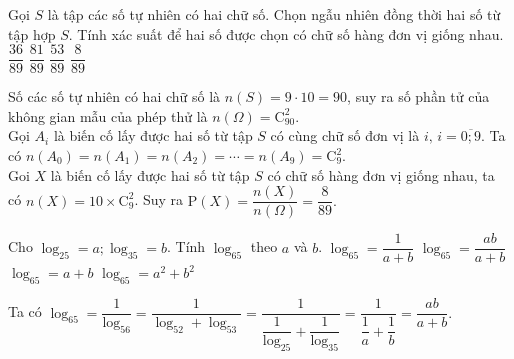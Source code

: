 \begin{ex}
{}	

\end{ex}

\begin{ex}%
	Gọi $S$ là tập các số tự nhiên có hai chữ số. Chọn ngẫu nhiên đồng thời hai số từ tập hợp $S$. Tính xác suất để hai số được chọn có chữ số hàng đơn vị giống nhau.
		\choice
	{$\dfrac{36}{89}$}
	{$\dfrac{81}{89}$}
	{$\dfrac{53}{89}$}
	{\True $\dfrac{8}{89}$}
	\loigiai
	{ Số các số tự nhiên có hai chữ số là $ n(S)=9 \cdot 10= 90$, suy ra số phần tử của không gian mẫu của phép thử là $n \left( \Omega\right) = \mathrm{C}_{90}^2$.\\
		Gọi $A_i$ là biến cố lấy được hai số từ tập $S$ có cùng chữ số đơn vị là $i, \, i= \overline{0;9}$. Ta có $n(A_0)= n(A_1) =n(A_2) = \cdots = n(A_9) =\mathrm{C}_{9}^2. $\\
		Goi $X$ là biến cố lấy được hai số từ tập $S$ có chữ số hàng đơn vị giống nhau, ta có $n (X) = 10 \times \mathrm{C}_{9}^2$. Suy ra $\mathrm{P}(X) = \dfrac{n(X)}{n(\Omega)} = \dfrac{8}{89}.$
		
	}
\end{ex}

\begin{ex}%
	Cho $\log_25=a; \log_35=b$. Tính $\log_65$ theo $a$ và $b$.
		\choice
	{$\log_65 = \dfrac{1}{a+b}$}
	{\True $\log_65 = \dfrac{ab}{a+b}$}
	{$\log_65=a+b$}
	{$\log_65 =a^2+b^2$}
	\loigiai
	{ Ta có $\log_65 =\dfrac{1}{\log_56}= \dfrac{1}{\log_52+\log_53}=\dfrac{1}{\dfrac{1}{\log_25}+\dfrac{1}{\log_35}}=\dfrac{1}{\dfrac{1}{a}+\dfrac{1}{b}}= \dfrac{ab}{a+b}.$
		
	}
\end{ex}

